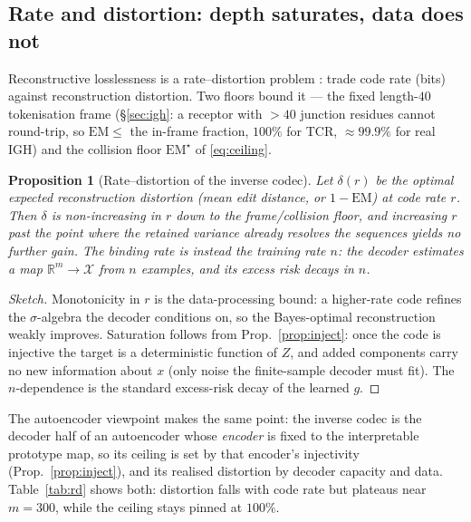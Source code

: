 \documentclass[11pt]{article}
\theoremstyle{oldplain}
\newtheorem{proposition}{Proposition}
\theoremstyle{oldrem}
\newcommand{\R}{\mathds{R}}  %
\begin{document}
\subsection{Rate and distortion: depth saturates, data does not}\label{sec:loss-rd}

Reconstructive losslessness is a rate--distortion problem \cite{Shannon1948,CoverThomas2006}: trade
code rate (bits) against reconstruction distortion. Two floors bound it --- the fixed length-$40$
tokenisation frame (\S\ref{sec:igh}: a receptor with $>40$ junction residues cannot round-trip, so
$\mathrm{EM}\le$ the in-frame fraction, $100\%$ for {\scshape TCR}, $\approx99.9\%$ for real
{\scshape IGH}) and the collision floor $\mathrm{EM}^\star$ of \eqref{eq:ceiling}.

\begin{proposition}[Rate--distortion of the inverse codec]\label{prop:rd}
Let $\delta(r)$ be the optimal expected reconstruction distortion (mean edit distance, or
$1-\mathrm{EM}$) at code rate $r$. Then $\delta$ is non-increasing in $r$ down to the frame/collision
floor, and increasing $r$ past the point where the retained variance already resolves the sequences
yields no further gain. The binding rate is instead the \emph{training} rate $n$: the decoder
estimates a map $\R^m\to\mathcal X$ from $n$ examples, and its excess risk decays in $n$.
\end{proposition}
\begin{proof}[Sketch]
Monotonicity in $r$ is the data-processing bound: a higher-rate code refines the $\sigma$-algebra
the decoder conditions on, so the Bayes-optimal reconstruction weakly improves. Saturation follows
from Prop.~\ref{prop:inject}: once the code is injective the target is a deterministic function of
$Z$, and added components carry no new information about $x$ (only noise the finite-sample decoder
must fit). The $n$-dependence is the standard excess-risk decay of the learned $g$.
\end{proof}

The autoencoder viewpoint \cite{HintonSalakhutdinov2006} makes the same point: the inverse codec is
the decoder half of an autoencoder whose \emph{encoder} is fixed to the interpretable prototype map,
so its ceiling is set by that encoder's injectivity (Prop.~\ref{prop:inject}), and its realised
distortion by decoder capacity and data. Table~\ref{tab:rd} shows both: distortion falls with code
rate but plateaus near $m=300$, while the ceiling stays pinned at $100\%$.
\end{document}
